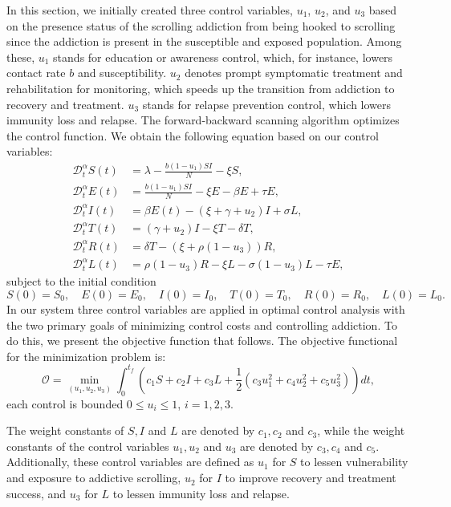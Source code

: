 \documentclass[10pt]{NSP1}
\newcommand{\CD}{\mathcal{D}}
\begin{document}
In this section, we initially created three control variables, $u_1$, $u_2$, and $u_3$ based on the presence status of the scrolling addiction from being hooked to scrolling since the addiction is present in the susceptible and exposed population. Among these, $u_1$ stands for education or awareness control, which, for instance, lowers contact rate $b$ and susceptibility. $u_2$ denotes prompt symptomatic treatment and rehabilitation for monitoring, which speeds up the transition from addiction to recovery and treatment. $u_3$ stands for relapse prevention control, which lowers immunity loss and relapse. The forward-backward scanning algorithm optimizes the control function. We obtain the following equation based on our control variables:
\begin{equation}
\begin{aligned}
  \CD_t^\alpha S(t) &= \lambda - \frac{b(1-u_1) S I}{N} - \xi S, \\
  \CD_t^\alpha E(t) &= \frac{b(1-u_1) S I}{N} - \xi E - \beta E + \tau E, \\
  \CD_t^\alpha I(t) &= \beta E(t) - (\xi + \gamma + u_2) I + \sigma L, \\
  \CD_t^\alpha T(t) &= (\gamma + u_2) I - \xi T - \delta T, \\
  \CD_t^\alpha R(t) &= \delta T - (\xi + \rho(1-u_3)) R, \\
  \CD_t^\alpha L(t) &= \rho(1-u_3) R - \xi L - \sigma(1-u_3) L - \tau E,
\end{aligned}
\tag{5.1}
\end{equation}
subject to the initial condition
\begin{equation}
S(0) = S_0, \quad E(0) = E_0, \quad I(0) = I_0, \quad T(0) = T_0, \quad R(0) = R_0, \quad L(0) = L_0.
\tag{5.2}
\end{equation}
In our system three control variables are applied in optimal control analysis with the two primary goals of minimizing control costs and controlling addiction. To do this, we present the objective function that follows. The objective functional for the minimization problem is:
\begin{equation}
\mathcal{O} = \min_{(u_1,u_2,u_3)} \int_0^{t_f} \left( c_1 S + c_2 I + c_3 L + \frac{1}{2} \left( c_3 u_1^2 + c_4 u_2^2 + c_5 u_3^2 \right) \right) dt,
\tag{5.3}
\end{equation}
each control is bounded $0 \leq u_i \leq 1$, $i=1,2,3$.

The weight constants of $S, I$ and $L$ are denoted by $c_1, c_2$ and $c_3$, while the weight constants of the control variables $u_1, u_2$ and $u_3$ are denoted by $c_3, c_4$ and $c_5$. Additionally, these control variables are defined as $u_1$ for $S$ to lessen vulnerability and exposure to addictive scrolling, $u_2$ for $I$ to improve recovery and treatment success, and $u_3$ for $L$ to lessen immunity loss and relapse.
\end{document}
